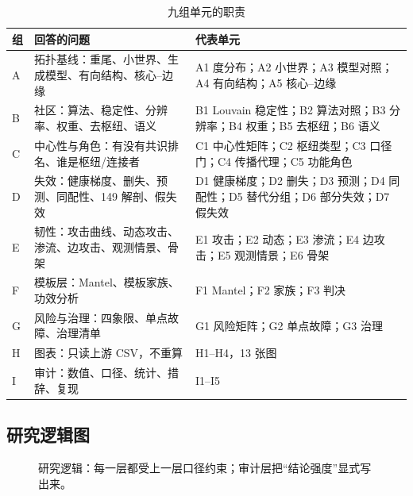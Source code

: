 \begin{table}[H]
\centering
\caption{九组单元的职责}
\small
\begin{tabularx}{\textwidth}{@{}p{}p{}X@{}}
\toprule
组 & 回答的问题 & 代表单元 \\
\midrule
A & 拓扑基线：重尾、小世界、生成模型、有向结构、核心--边缘 & A1 度分布；A2 小世界；A3 模型对照；A4 有向结构；A5 核心--边缘 \\
B & 社区：算法、稳定性、分辨率、权重、去枢纽、语义 & B1 Louvain 稳定性；B2 算法对照；B3 分辨率；B4 权重；B5 去枢纽；B6 语义 \\
C & 中心性与角色：有没有共识排名、谁是枢纽/连接者 & C1 中心性矩阵；C2 枢纽类型；C3 口径门；C4 传播代理；C5 功能角色 \\
D & 失效：健康梯度、删失、预测、同配性、149 解剖、假失效 & D1 健康梯度；D2 删失；D3 预测；D4 同配性；D5 替代分组；D6 部分失效；D7 假失效 \\
E & 韧性：攻击曲线、动态攻击、渗流、边攻击、观测情景、骨架 & E1 攻击；E2 动态；E3 渗流；E4 边攻击；E5 观测情景；E6 骨架 \\
F & 模板层：Mantel、模板家族、功效分析 & F1 Mantel；F2 家族；F3 判决 \\
G & 风险与治理：四象限、单点故障、治理清单 & G1 风险矩阵；G2 单点故障；G3 治理 \\
H & 图表：只读上游 CSV，不重算 & H1--H4，13 张图 \\
I & 审计：数值、口径、统计、措辞、复现 & I1--I5 \\
\bottomrule
\end{tabularx}
\end{table}

\subsection{研究逻辑图}

\begin{figure}[H]
\centering
{}
\caption{研究逻辑：每一层都受上一层口径约束；审计层把“结论强度”显式写出来。}
\end{figure}

